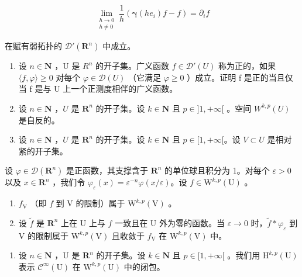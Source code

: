 \[
\lim_{\substack{h\to 0\\ h\neq 0}}\frac{1}{h} (\boldsymbol {\gamma}(he_{i})f - f) = \partial_{i}f
\]

在赋有弱拓扑的 \(\mathcal{D}'(\mathbf{R}^n)\) 中成立。

\begin{enumerate}
\def\labelenumi{\arabic{enumi})}
\setcounter{enumi}{7}
\item
  设 \(n \in \mathbf{N}\) ，U 是 \(R^{n}\) 的开子集。广义函数 \(f \in \mathcal{D}'(U)\) 称为正的，如果 \(\langle f, \varphi \rangle \geqslant 0\) 对每个 \(\varphi \in \mathcal{D}(U)\) （它满足 \(\varphi \geqslant 0\) ）成立。证明 f 是正的当且仅当 f 是与 U 上一个正测度相伴的广义函数。
\item
  设 \(n \in \mathbf{N}\) ，\(U\) 是 \(\mathbf{R}^n\) 的开子集。设 \(k \in \mathbf{N}\) 且 \(p \in ]1, +\infty[\) 。空间 \(W^{k,p}(U)\) 是自反的。
\item
  设 \(n \in \mathbf{N}\) ，\(U\) 是 \(\mathbf{R}^n\) 的开子集。设 \(k \in \mathbf{N}\) 且 \(p \in [1, +\infty[\)。设 \(V \subset U\) 是相对紧的开子集。
\end{enumerate}

设 \(\varphi \in \mathcal{D}(\mathbf{R}^n)\) 是正函数，其支撑含于 \(\mathbf{R}^n\) 的单位球且积分为 1。对每个 \(\varepsilon > 0\) 以及 \(x \in \mathbf{R}^n\) ，我们令 \(\varphi_{\varepsilon}(x) = \varepsilon^{-n}\varphi(x/\varepsilon)\)。设 \(f \in \mathrm{W}^{k,p}(\mathrm{U})\) 。

\begin{enumerate}
\def\labelenumi{\alph{enumi})}
\item
  \(f_{\mathrm{V}}\) （即 \(f\) 到 V 的限制）属于 \(\mathrm{W}^{k,p}(\mathrm{V})\) 。
\item
  设 \(\widetilde{f}\) 是 \(\mathbf{R}^n\) 上在 U 上与 \(f\) 一致且在 U 外为零的函数。当 \(\varepsilon \to 0\) 时，\(\widetilde{f} * \varphi_{\varepsilon}\) 到 V 的限制属于 \(\mathrm{W}^{k,p}(\mathrm{V})\) 且收敛于 \(f_{\mathrm{V}}\) 在 \(\mathrm{W}^{k,p}(\mathrm{V})\) 中。
\end{enumerate}

\begin{enumerate}
\def\labelenumi{\arabic{enumi})}
\setcounter{enumi}{10}
\tightlist
\item
  设 \(n \in \mathbf{N}\) ，U 是 \(\mathbf{R}^n\) 的开子集。设 \(k \in \mathbf{N}\) 且 \(p \in [1, +\infty[\) 。我们用 \(\mathrm{H}^{k,p}(\mathrm{U})\) 表示 \(\mathcal{C}^{\infty}(\mathrm{U})\) 在 \(\mathrm{W}^{k,p}(\mathrm{U})\) 中的闭包。
\end{enumerate}

